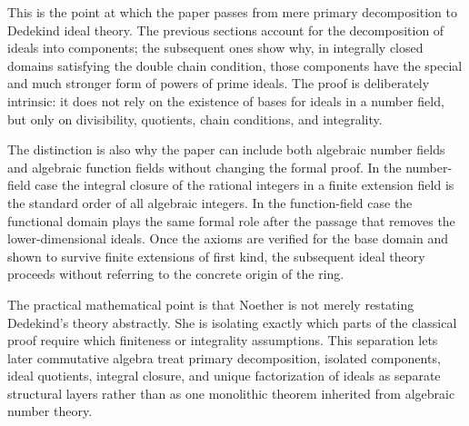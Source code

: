 \documentclass[12pt]{article}
\begin{document}
This is the point at which the paper passes from mere primary decomposition to Dedekind ideal theory. The previous sections account for the decomposition of ideals into components; the subsequent ones show why, in integrally closed domains satisfying the double chain condition, those components have the special and much stronger form of powers of prime ideals. The proof is deliberately intrinsic: it does not rely on the existence of bases for ideals in a number field, but only on divisibility, quotients, chain conditions, and integrality.

The distinction is also why the paper can include both algebraic number fields and algebraic function fields without changing the formal proof. In the number-field case the integral closure of the rational integers in a finite extension field is the standard order of all algebraic integers. In the function-field case the functional domain plays the same formal role after the passage that removes the lower-dimensional ideals. Once the axioms are verified for the base domain and shown to survive finite extensions of first kind, the subsequent ideal theory proceeds without referring to the concrete origin of the ring.

The practical mathematical point is that Noether is not merely restating Dedekind's theory abstractly. She is isolating exactly which parts of the classical proof require which finiteness or integrality assumptions. This separation lets later commutative algebra treat primary decomposition, isolated components, ideal quotients, integral closure, and unique factorization of ideals as separate structural layers rather than as one monolithic theorem inherited from algebraic number theory.
\end{document}
